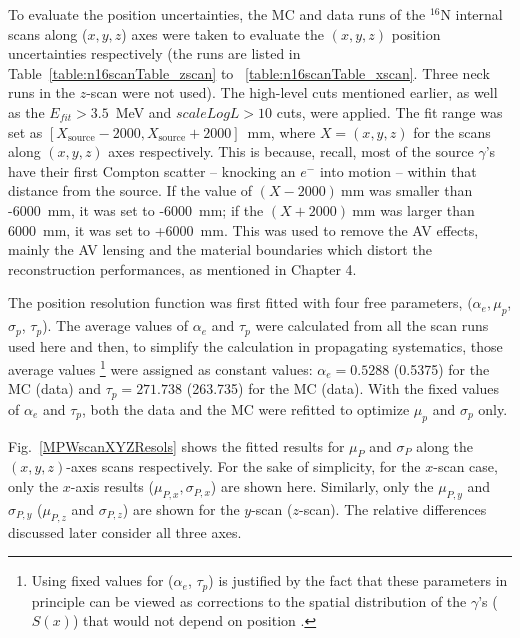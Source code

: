 To evaluate the position uncertainties, the MC and data runs of the $^{16}$N internal scans along ($x, y, z$) axes were taken to evaluate the $(x, y, z)$ position uncertainties respectively (the runs are listed in Table~\ref{table:n16scanTable_zscan} to ~\ref{table:n16scanTable_xscan}. Three neck runs in the $z$-scan were not used). The high-level cuts mentioned earlier, as well as the $E_{fit}>3.5$~MeV and $scaleLogL>10$ cuts, were applied. The fit range was set as $[X_\mathrm{source}-2000, X_\mathrm{source}+2000]$~mm, where $X=(x,y,z)$ for the scans along $(x,y,z)$ axes respectively. This is because, recall, most of the source $\gamma$'s have their first Compton scatter -- knocking an $e^{-}$ into motion -- within that distance from the source. If the value of $(X-2000)~$mm was smaller than -6000~mm, it was set to -6000~mm; if the $(X+2000)~$mm was larger than 6000~mm, it was set to +6000~mm. This was used to remove the AV effects, mainly the AV lensing and the material boundaries which distort the reconstruction performances, as mentioned in Chapter 4.

The position resolution function was first fitted with four free parameters, $(\alpha_e,\mu_p$, $\sigma_p$, $\tau_p$). The average values of $\alpha_e$ and $\tau_p$ were calculated from all the scan runs used here and then, to simplify the calculation in propagating systematics, those average values \footnote{Using fixed values for ($\alpha_e$, $\tau_p$) is justified by the fact that these parameters in principle can be viewed as corrections to the spatial distribution of the $\gamma$'s ($S(x)$) that would not depend on position \cite{waterunidoc}.} were assigned as constant values: $\alpha_e=0.5288$ (0.5375) for the MC (data) and $\tau_p=271.738$ (263.735) for the MC (data). With the fixed values of $\alpha_e$ and $\tau_p$, both the data and the MC were refitted to optimize $\mu_p$ and $\sigma_p$ only. 

Fig.~\ref{MPWscanXYZResols} shows the fitted results for $\mu_P$ and $\sigma_P$ along the $(x, y, z)$-axes scans respectively. For the sake of simplicity, for the $x$-scan case, only the $x$-axis results ($\mu_{P,x},\sigma_{P,x}$) are shown here. Similarly, only the $\mu_{P,y}$ and $\sigma_{P,y}$ ($\mu_{P,z}$ and $\sigma_{P,z}$) are shown for the $y$-scan ($z$-scan). The relative differences discussed later consider all three axes.

